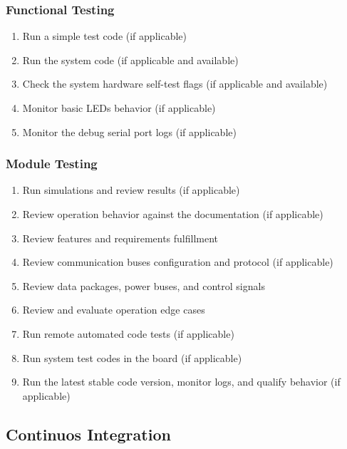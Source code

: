 \subsubsection{Functional Testing}

\begin{enumerate} \setlength\itemsep{-0.3em}
    \item Run a simple test code (if applicable) 
    \item Run the system code (if applicable and available) 
    \item Check the system hardware self-test flags (if applicable and available) 
    \item Monitor basic LEDs behavior (if applicable) 
    \item Monitor the debug serial port logs (if applicable)
\end{enumerate}

\subsubsection{Module Testing}

\begin{enumerate} \setlength\itemsep{-0.3em}
    \item Run simulations and review results (if applicable)
    \item Review operation behavior against the documentation (if applicable)
    \item Review features and requirements fulfillment
    \item Review communication buses configuration and protocol (if applicable)
    \item Review data packages, power buses, and control signals
    \item Review and evaluate operation edge cases
    \item Run remote automated code tests (if applicable)
    \item Run system test codes in the board (if applicable)
    \item Run the latest stable code version, monitor logs, and qualify behavior (if applicable)
\end{enumerate}

\subsection{Continuos Integration}

